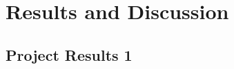 \section{Results and Discussion}\label{sec:Results}

\subsection{Project Results 1}\label{sec:project results}


